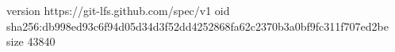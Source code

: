 version https://git-lfs.github.com/spec/v1
oid sha256:db998ed93c6f94d05d34d3f52dd4252868fa62c2370b3a0bf9fc311f707ed2be
size 43840
